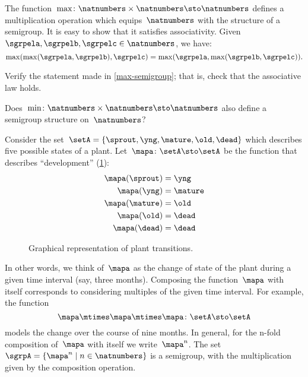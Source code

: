 \begin{example}
    \label{max-semigroup}
    The function~$\max \colon \natnumbers \times \natnumbers \sto \natnumbers$ defines a multiplication operation which equips~$\natnumbers$ with the structure of a semigroup.
    It is easy to show that it satisfies associativity. Given~$\sgrpela,\sgrpelb,\sgrpelc\in \natnumbers$, we have:
    \begin{equation*}
        \label{eq:max-assoc}
        \max(\max(\sgrpela,\sgrpelb),\sgrpelc)=\max(\sgrpela,\max(\sgrpelb,\sgrpelc)).
    \end{equation*}
\end{example}

\begin{exercise}
    \label{ex:max-semigroup}
    Verify the statement made in \cref{max-semigroup}; that is, check that the associative law holds.

    Does~$\min \colon \natnumbers \times \natnumbers \sto \natnumbers$ also define a semigroup structure on~$\natnumbers$?
\end{exercise}
\begin{solution}
\end{solution}

\begin{example}
    \label{plant-trafo-semigroup}
    Consider the set~$\setA = \{ \sprout, \yng, \mature, \old, \dead \}$ which describes five possible states of a plant. Let~$\mapa \colon \setA \sto \setA$ be the function that describes ``development'' (\cref{fig:plants_transitions}):
    \begin{align*}
        \mapa(\sprout) &=  \yng \\
        \mapa(\yng) &=  \mature \\
        \mapa(\mature) &=  \old \\
        \mapa( \old) &= \dead \\
        \mapa (\dead) &= \dead
    \end{align*}
    \begin{figure}[h]
        \caption{Graphical representation of plant transitions.}
        \label{fig:plants_transitions}
    \end{figure}
    In other words, we think of~$\mapa$ as the change of state of the plant during a given time interval (say, three months).
    Composing the function~$\mapa$ with itself corresponds to considering multiples of the given time interval.
    For example, the function
    \begin{equation*}
        \mapa \mtimes \mapa \mtimes \mapa \colon \setA \sto \setA
    \end{equation*}
    models the change over the course of nine months.
    In general, for the n-fold composition of~$\mapa$ with itself we write~$\mapa^n$.
    The set~$\sgrpA = \{ \mapa^n \mid n \in \natnumbers \}$ is a semigroup, with the multiplication given by the composition operation.
\end{example}

